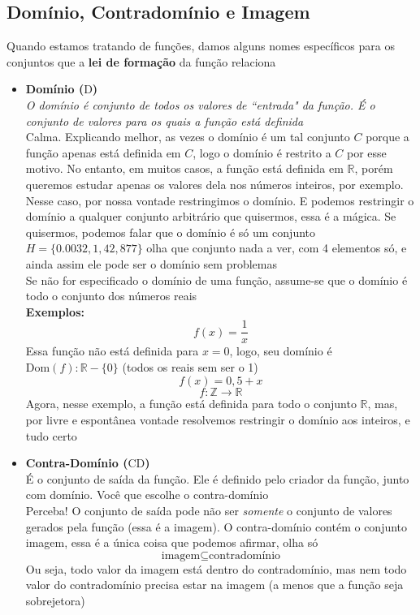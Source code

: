 \documentclass{article}
\begin{document}
\subsection{Domínio, Contradomínio e Imagem}
Quando estamos tratando de funções, damos alguns nomes específicos para os conjuntos que a \textbf{lei de formação} da função relaciona
\begin{itemize}
    \item \textbf{Domínio ($\mathrm{D}$)}
    \\[5pt]
    \textit{O domínio é conjunto de todos os valores de ``entrada" da função. É o conjunto de valores para os quais a função está definida}
    \\[5pt]
    Calma. Explicando melhor, as vezes o domínio é um tal conjunto $C$ porque a função apenas está definida em $C$, logo o domínio é restrito a $C$ por esse motivo. No entanto, em muitos casos, a função está definida em $\mathbb{R}$, porém queremos estudar apenas os valores dela nos números inteiros, por exemplo. Nesse caso, por nossa vontade restringimos o domínio. E podemos restringir o domínio a qualquer conjunto arbitrário que quisermos, essa é a mágica. Se quisermos, podemos falar que o domínio é só um conjunto $H = \{0.0032, 1, 42, 877\}$ olha que conjunto nada a ver, com 4 elementos só, e ainda assim ele pode ser o domínio sem problemas
    \\[5pt]
    Se não for especificado o domínio de uma função, assume-se que o domínio é todo o conjunto dos números reais
    \\[5pt]
    \textbf{Exemplos:}
    \[f(x) = \frac{1}{x}\]
    Essa função não está definida para $x = 0$, logo, seu domínio é $\mathrm{Dom}(f):\mathbb{R} - \{0\}$ (todos os reais sem ser o 1)
    \[f(x) = 0,5 + x\]
    \[f:\mathbb{Z}\xrightarrow{}\mathbb{R}\]
    Agora, nesse exemplo, a função está definida para todo o conjunto $\mathbb{R}$, mas, por livre e espontânea vontade resolvemos restringir o domínio aos inteiros, e tudo certo

    \item \textbf{Contra-Domínio ($\mathrm{CD}$)}
    \\[5pt]
    É o conjunto de saída da função. Ele é definido pelo criador da função, junto com domínio. Você que escolhe o contra-domínio
    \\[5pt]
    Perceba! O conjunto de saída pode não ser \textit{somente} o conjunto de valores gerados pela função (essa é a imagem). O contra-domínio contém o conjunto imagem, essa é a única coisa que podemos afirmar, olha só
    \[
    \text{imagem} \subseteq \text{contradomínio}
    \]
    Ou seja, todo valor da imagem está dentro do contradomínio, mas nem todo valor do contradomínio precisa estar na imagem (a menos que a função seja sobrejetora)


\end{itemize}
\end{document}
